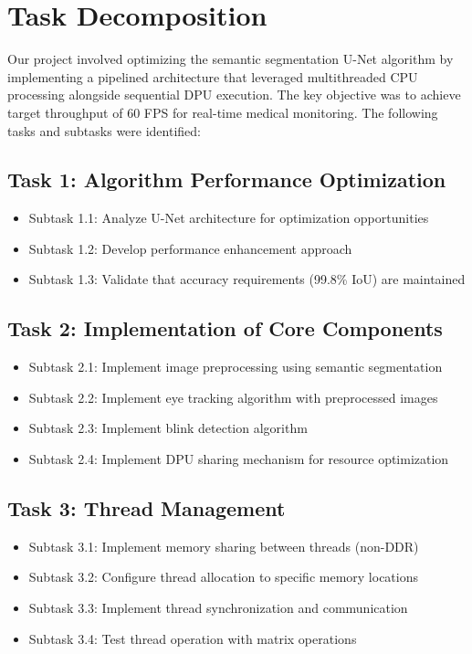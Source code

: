 \section{Task Decomposition}\label{sec:task-decomposition}

Our project involved optimizing the semantic segmentation U-Net algorithm by implementing a pipelined architecture that leveraged multithreaded CPU processing alongside sequential DPU execution\@. The key objective was to achieve target throughput of 60 FPS for real-time medical monitoring. The following tasks and subtasks were identified:

\subsection{Task 1: Algorithm Performance Optimization}
\begin{itemize}
\item Subtask 1.1: Analyze U-Net architecture for optimization opportunities
\item Subtask 1.2: Develop performance enhancement approach
\item Subtask 1.3: Validate that accuracy requirements (99.8\% IoU) are maintained
\end{itemize}

\subsection{Task 2: Implementation of Core Components}
\begin{itemize}
\item Subtask 2.1: Implement image preprocessing using semantic segmentation
\item Subtask 2.2: Implement eye tracking algorithm with preprocessed images
\item Subtask 2.3: Implement blink detection algorithm
\item Subtask 2.4: Implement DPU sharing mechanism for resource optimization
\end{itemize}

\subsection{Task 3: Thread Management}
\begin{itemize}
\item Subtask 3.1: Implement memory sharing between threads (non-DDR)
\item Subtask 3.2: Configure thread allocation to specific memory locations
\item Subtask 3.3: Implement thread synchronization and communication~\cite{park2022thread}
\item Subtask 3.4: Test thread operation with matrix operations
\end{itemize}

